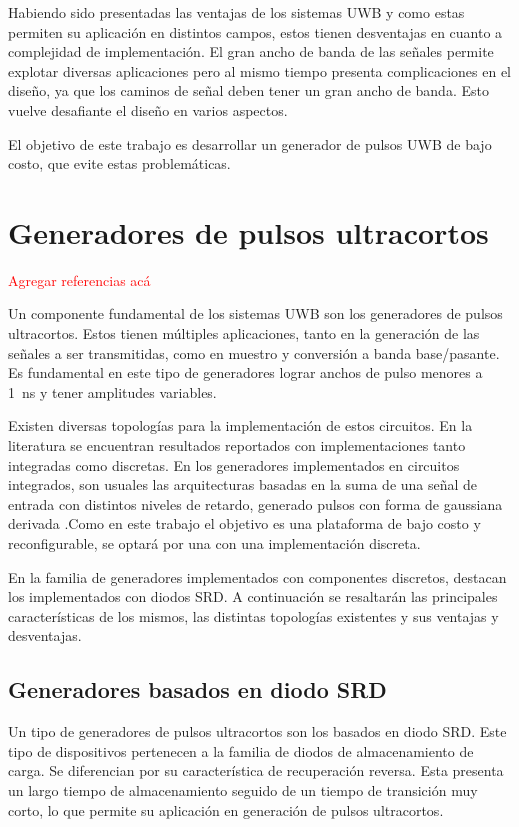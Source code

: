 Habiendo sido presentadas las ventajas de los sistemas UWB y como estas permiten
su aplicación en distintos campos, estos tienen desventajas en cuanto a
complejidad de implementación. El gran ancho de banda de las señales permite
explotar diversas aplicaciones pero al mismo tiempo presenta complicaciones en
el diseño, ya que los caminos de señal deben tener un gran ancho de banda. Esto
vuelve desafiante el diseño en varios aspectos.

El objetivo de este trabajo es desarrollar un generador de pulsos UWB de bajo
costo, que evite estas problemáticas.

\section{Generadores de pulsos ultracortos}

\textcolor{red}{Agregar referencias acá}

Un componente fundamental de los sistemas UWB son los generadores de pulsos
ultracortos. Estos tienen múltiples aplicaciones, tanto en la generación de las
señales a ser transmitidas, como en muestro y conversión a banda
base/pasante. Es fundamental en este tipo de generadores lograr anchos de pulso
menores a \qty{1}{\nano\second} y tener amplitudes variables.

Existen diversas topologías para la implementación de estos circuitos. En la
literatura se encuentran resultados reportados con implementaciones tanto
integradas como discretas. En los generadores implementados en circuitos
integrados, son usuales las arquitecturas basadas en la suma de una señal de
entrada con distintos niveles de retardo, generado pulsos con forma de gaussiana
derivada \cite{Nguyen2012} \cite{Salehi2010} \cite{An2018}.Como en este trabajo
el objetivo es una plataforma de bajo costo y reconfigurable, se optará por una
con una implementación discreta.

En la familia de generadores implementados con componentes discretos, destacan
los implementados con diodos SRD. A continuación se resaltarán las principales
características de los mismos, las distintas topologías existentes y sus
ventajas y desventajas.

\subsection{Generadores basados en diodo SRD}

Un tipo de generadores de pulsos ultracortos son los basados en diodo SRD. Este
tipo de dispositivos pertenecen a la familia de diodos de almacenamiento de
carga. Se diferencian por su característica de recuperación reversa. Esta
presenta un largo tiempo de almacenamiento seguido de un tiempo de transición
muy corto, lo que permite su aplicación en generación de pulsos ultracortos.

